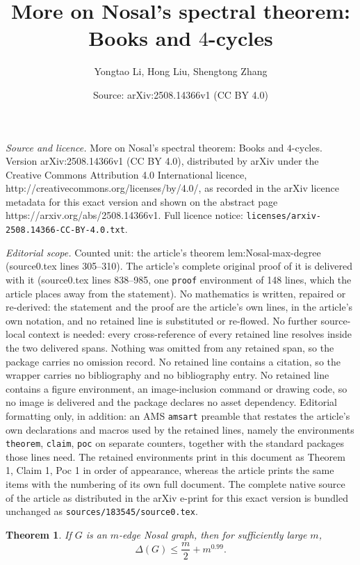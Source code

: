 \documentclass[10pt,a4paper]{amsart}
\title{More on Nosal's spectral theorem: Books and $4$-cycles}
\author{Yongtao Li, Hong Liu, Shengtong Zhang}
\date{Source: arXiv:2508.14366v1 (CC BY 4.0)}
\newtheorem{theorem}{Theorem}
\begin{document}
\maketitle

\noindent\emph{Source and licence.} More on Nosal's spectral theorem: Books and $4$-cycles. Version arXiv:2508.14366v1 (CC BY 4.0), distributed by arXiv under the Creative Commons Attribution 4.0 International licence, http://creativecommons.org/licenses/by/4.0/, as recorded in the arXiv licence metadata for this exact version and shown on the abstract page https://arxiv.org/abs/2508.14366v1. Full licence notice: \texttt{licenses/arxiv-2508.14366-CC-BY-4.0.txt}.\par\smallskip

\noindent\textit{Editorial scope.} Counted unit: the article's theorem lem:Nosal-max-degree (source0.tex lines 305--310). The article's complete original proof of it is delivered with it (source0.tex lines 838--985, one \texttt{proof} environment of 148 lines, which the article places away from the statement). No mathematics is written, repaired or re-derived: the statement and the proof are the article's own lines, in the article's own notation, and no retained line is substituted or re-flowed.  No further source-local context is needed: every cross-reference of every retained line resolves inside the two delivered spans.  Nothing was omitted from any retained span, so the package carries no omission record.  No retained line contains a citation, so the wrapper carries no bibliography and no bibliography entry.  No retained line contains a figure environment, an image-inclusion command or drawing code, so no image is delivered and the package declares no asset dependency.  Editorial formatting only, in addition: an AMS \texttt{amsart} preamble that restates the article's own declarations and macros used by the retained lines, namely the environments \texttt{theorem}, \texttt{claim}, \texttt{poc} on separate counters, together with the standard packages those lines need.  The retained environments print in this document as Theorem 1, Claim 1, Poc 1 in order of appearance, whereas the article prints the same items with the numbering of its own full document.  The complete native source of the article as distributed in the arXiv e-print for this exact version is bundled unchanged as \texttt{sources/183545/source0.tex}.
\begin{theorem}
        \label{lem:Nosal-max-degree}
    If $G$ is an $m$-edge Nosal graph, 
    then for sufficiently large $m$,  
    \[ \Delta(G) \leq \frac{m}{2} + m^{0.99}.\] 
\end{theorem}
\end{document}
